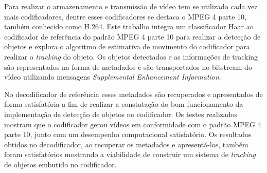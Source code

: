 \begin{resumo}
        
Para realizar o armazenamento e transmissão de vídeo tem se utilizado cada vez mais codificadores, dentre esses codificadores se destaca o MPEG 4 parte 10, também conhecido como H.264. Este trabalho integra um classificador Haar ao codificador de referência do padrão MPEG 4 parte 10 para realizar a detecção de objetos e explora o algoritmo de estimativa de movimento do codificador para realizar o \textit{tracking} do objeto. Os objetos detectados e as informações de tracking são representados na forma de metadados e são transportados no bitstream do vídeo utilizando mensagens \textit{Supplemental Enhancement Information}.

No decodificador de referência esses metadados são recuperados e apresentados de forma satisfatória a fim de realizar a constatação do bom funcionamento da implementação de detecção de objetos no codificador. Os testes realizados mostram que o codificador gerou vídeos em conformidade com o padrão  MPEG 4 parte 10, junto com um desempenho computacional satisfatório. Os resultados obtidos no decodificador, ao recuperar os metadados e apresentá-los, também foram satisfatórios mostrando a viabilidade de construir um sistema de \textit{tracking} de objetos embutido no codificador.

\end{resumo}
